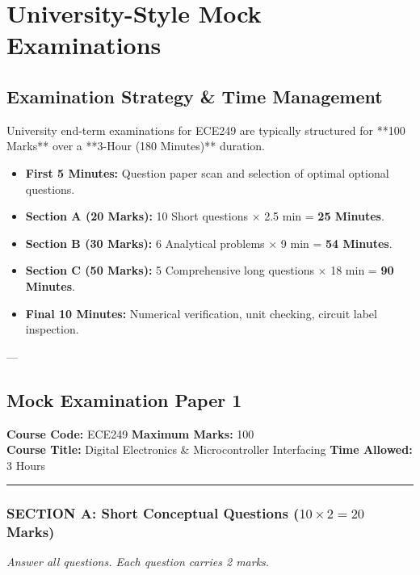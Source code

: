 \chapter{University-Style Mock Examinations}
\label{chap:mock-examinations}

\section{Examination Strategy \& Time Management}
University end-term examinations for ECE249 are typically structured for **100 Marks** over a **3-Hour (180 Minutes)** duration.

\begin{examtip}
\begin{itemize}
    \item \textbf{First 5 Minutes:} Question paper scan and selection of optimal optional questions.
    \item \textbf{Section A (20 Marks):} 10 Short questions $\times$ 2.5 min = \textbf{25 Minutes}.
    \item \textbf{Section B (30 Marks):} 6 Analytical problems $\times$ 9 min = \textbf{54 Minutes}.
    \item \textbf{Section C (50 Marks):} 5 Comprehensive long questions $\times$ 18 min = \textbf{90 Minutes}.
    \item \textbf{Final 10 Minutes:} Numerical verification, unit checking, circuit label inspection.
\end{itemize}
\end{examtip}

---

\section{Mock Examination Paper 1}
\noindent\textbf{Course Code:} ECE249 \hfill \textbf{Maximum Marks:} 100 \\
\textbf{Course Title:} Digital Electronics \& Microcontroller Interfacing \hfill \textbf{Time Allowed:} 3 Hours

\vspace{0.4cm}
\noindent\rule{\textwidth}{1.2pt}

\subsection*{SECTION A: Short Conceptual Questions ($10 \times 2 = 20$ Marks)}
\noindent\textit{Answer all questions. Each question carries 2 marks.}

